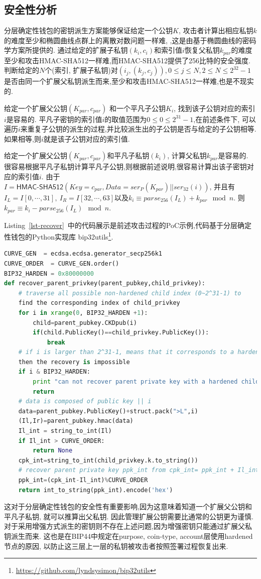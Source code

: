 \subsection{安全性分析}\label{sec-security}

分层确定性钱包的密钥派生方案能够保证给定一个公钥$K$,
攻击者计算出相应私钥$k$的难度至少和椭圆曲线点群上的离散对数问题一样难,
,这是由基于椭圆曲线的密码学方案所提供的.
通过给定的扩展子私钥$(k_i,c_i)$和索引值$i$恢复父私钥$k_{par}$的难度
至少和攻击\textsf{HMAC-SHA512}一样难,而\textsf{HMAC-SHA512}提供了256比特的安全强度.
判断给定的$N$个(索引, 扩展子私钥)对$(i_j, (k_j, c_j)), 0\leq j \leq N, 2\leq N \leq 2^{32}-1$
是否由同一个扩展父私钥派生而来,至少和攻击\textsf{HMAC-SHA512}一样难,也是不现实的.

给定一个扩展父公钥$(K_{par},c_{par})$ 和一个平凡子公钥$K_i$, 找到该子公钥对应的索引$i$是容易的.
平凡子密钥的索引值$i$的取值范围为$0\leq 0\leq2^{31}-1$,在前述条件下,
可以遍历$i$来重复子公钥的派生的过程,并比较派生出的子公钥是否与给定的子公钥相等.
如果相等,则$i$就是该子公钥对应的索引值.

给定一个扩展父公钥$(K_{par},c_{par})$和平凡子私钥$(k_i)$, 计算父私钥$k_{par}$是容易的.
很容易根据平凡子私钥计算平凡子公钥,则根据前述说明,很容易计算出该子密钥对应的索引值$i$.
由于$I = \textsf{HMAC-SHA512}(Key = c_{par}, Data = ser_P(K_{par}) || ser_{32}(i))$, 
并且有$I_L = I[0,\cdots,31], \ I_R = I[32,\cdots,63]$以及$k_i \equiv parse_{256}(I_L) + k_{par} \mod n$.   
则 $k_{par} \equiv k_i-parse_{256}(I_L)\mod n.$

Listing~\ref{lst-recover}~中的代码展示是前述攻击过程的PoC示例,代码基于分层确定性钱包的Python实现库
bip32utils\footnote{\url{https://github.com/lyndsysimon/bip32utils}}.

\begin{lstlisting}[language=python, caption=基于父扩展公钥和平凡子私钥恢复父私钥的攻击示例, label=lst-recover]
CURVE_GEN  = ecdsa.ecdsa.generator_secp256k1
CURVE_ORDER  = CURVE_GEN.order()
BIP32_HARDEN = 0x80000000 
def recover_parent_privkey(parent_pubkey,child_privkey):
	# traverse all possible non-hardened child index (0~2^31-1) to 
	find the corresponding index of child_privkey
	for i in xrange(0, BIP32_HARDEN +1):
		child=parent_pubkey.CKDpub(i)
		if(child.PublicKey()==child_privkey.PublicKey()):
			break
    # if i is larger than 2^31-1, means that it corresponds to a hardened child, 
    then the recovery is impossible
	if i & BIP32_HARDEN:
		print "can not recover parent private key with a hardened child node"
		return
	# data is composed of public key || i
	data=parent_pubkey.PublicKey()+struct.pack(">L",i)
	(Il,Ir)=parent_pubkey.hmac(data)
	Il_int = string_to_int(Il)
	if Il_int > CURVE_ORDER:
	    return None
	cpk_int=string_to_int(child_privkey.k.to_string())
	# recover parent private key ppk_int from cpk_int= ppk_int + Il_int mod n
	ppk_int=(cpk_int-Il_int)%CURVE_ORDER
	return int_to_string(ppk_int).encode('hex')
\end{lstlisting}

这对于分层确定性钱包的安全性有重要影响,因为这意味着知道一个扩展父公钥和平凡子私钥,
就可以推算出父私钥. 因此管理扩展公钥需要比通常的公钥更为谨慎.
对于采用增强方式派生的密钥则不存在上述问题,因为增强密钥只能通过扩展父私钥派生而来.
这也是在BIP44中规定在purpose, coin-type, account层使用hardened 节点的原因,
以防止这三层上一层的私钥被攻击者按照签署过程恢复出来.



